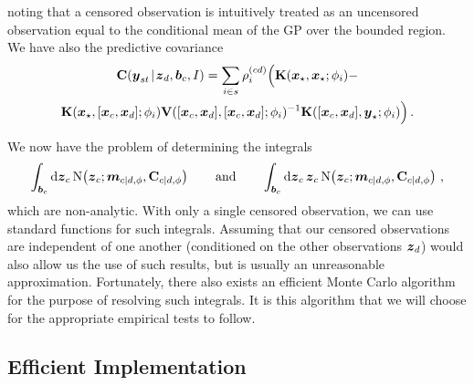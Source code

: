 \documentclass{acmtrans2m}
\begin{document}
noting that a censored observation is intuitively treated as an uncensored observation equal to the conditional mean of the GP over the bounded region. We have also the predictive covariance
\begin{multline*} %
\covsub{\vy}{st}{\vzD,\vect{b}_c,I}=\sum_{i\in s}\rho^{(cd)}_i \Big(\mat{K}(\vxst,\vxst;\phi_i)-\\\mat{K}(\vxst,[\vx_c,\vxD];\phi_i)\mat{V}([\vx_c,\vxD],[\vx_c,\vxD];\phi_i)^{-1}\mat{K}([\vx_c,\vxD],\vyst;\phi_i)\Big)\,.
\end{multline*}

We now have the problem of determining the integrals 
\begin{equation*} %
\int_{\vect{b}_c}\ud\vz_c\,\N{\vz_c}{\vect{m}_{c|d,\phi}}{\mat{C}_{c|d,\phi}} \qquad \text{and} \qquad
\int_{\vect{b}_c}\ud\vz_c\,\vz_c\, \N{\vz_c}{\vect{m}_{c|d,\phi}}{\mat{C}_{c|d,\phi}}\,,
\end{equation*}
which are non-analytic. With only a single censored observation, we can use standard functions for such integrals. Assuming that our censored observations are independent of one another (conditioned on the other observations $\boldsymbol{z}_d$) would also allow us the use of such results, but is usually an unreasonable approximation. Fortunately, there also exists an efficient Monte Carlo algorithm \cite{genz1992ncm} for the purpose of resolving such integrals. It is this algorithm that we will choose for the appropriate empirical tests to follow.

\subsection{Efficient Implementation}\label{sec_efficient}
\end{document}
